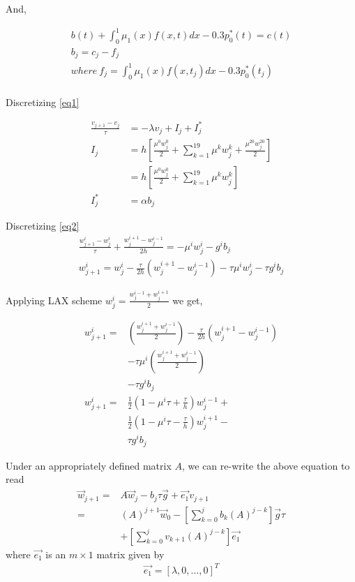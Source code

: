 \documentclass{ifacconf}
\begin{document}
And,

\begin{eqnarray}
b(t)+\int_0^1\mu_1(x)f(x,t)dx -0.3p_0^{*}(t) = c(t) \nonumber \\
b_j = c_j - f_j \\
where\ f_j = \int_0^1\mu_1(x)f(x,t_j)dx -0.3p_0^{*}(t_j)\\
\end{eqnarray}



Discretizing \eqref{eq1}

\begin{align} \label{eq:disceq1}
\frac{v_{j+1}-v_j}{\tau} &= -\lambda v_j + I_j + I_j^{*} \\
I_j &= h[\frac{\mu^0 w_j^0}{2} + \sum_{k=1}^{19} \mu^k w_j^k + \frac{\mu^{20} w_j^{20}}{2} ] \\
    &=  h[\frac{\mu^0 w_j^0}{2} + \sum_{k=1}^{19} \mu^k w_j^k ] \nonumber \\
I_j^{*} &= \alpha b_j
\end{align}


Discretizing \eqref{eq2}
\begin{align} \label{eq:disceq2}
\frac{w_{j+1}^i-w_{j}^i}{\tau} + \frac{w_j^{i+1}-w_j^{i-1}}{2h} = -\mu^iw_j^i - g^ib_j \nonumber\\
w_{j+1}^i=w_{j}^i-\frac{\tau}{2h}(w_j^{i+1}-w_j^{i-1})-\tau\mu^i w_j^i - \tau g^i b_j
\end{align}

Applying LAX scheme $w_j^i = \frac{w_j^{i-1} + w_j^{i+1}}{2}$ we get,

\begin{align*}
	w^i_{j+1} =& \left( \frac{w_j^{i+1} + w_j^{i-1}}{2} \right)
	-\frac{\tau}{2h}(w_j^{i+1}-w_j^{i-1}) \\
		&-\tau\mu^i\left( \frac{w_j^{i+1} + w_j^{i-1}}{2} \right)  \\
		&- \tau g^i b_j\\
	w^i_{j+1} =& \frac{1}{2}\left( 1-\mu^i\tau + \frac{\tau}{h} \right) w^{i-1}_j + \\
	           & \frac{1}{2}\left( 1-\mu^i\tau - \frac{\tau}{h} \right) w^{i+1}_j - \\
		   & \tau g^i b_j
\end{align*}

Under an appropriately defined matrix $A$, we can re-write the above equation to read
\begin{align}
	\vec{w}_{j+1} =& A\vec{w}_j - b_j\tau\vec{g} + \vec{e_1}v_{j+1} \\
	=& (A)^{j+1} \vec{w}_0 - \left[ \sum_{k=0}^j b_k (A)^{j-k} \right]\vec{g}\tau \\
	&+ \left[ \sum_{k=0}^j v_{k+1}(A)^{j-k} \right]\vec{e_1} \nonumber
\end{align}
where $\vec{e_1}$ is an $m\times1$ matrix given by
\begin{align}
	\vec{e_1} = \left[ \lambda,0,\dots,0 \right]^T
\end{align}
\end{document}
